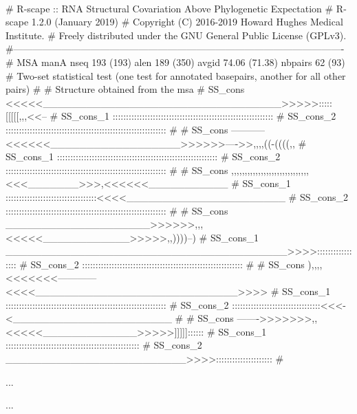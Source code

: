 \\


\begin{sreoutput}
# R-scape :: RNA Structural Covariation Above Phylogenetic Expectation
# R-scape 1.2.0 (January 2019)
# Copyright (C) 2016-2019 Howard Hughes Medical Institute.
# Freely distributed under the GNU General Public License (GPLv3).
#-------------------------------------------------------------------------------------------------------
# MSA manA nseq 193 (193) alen 189 (350) avgid 74.06 (71.38) nbpairs 62 (93)
# Two-set statistical test (one test for annotated basepairs, another for all other pairs)
#
# Structure obtained from the msa
# SS_cons   <<<<<_________________________________>>>>>:::::[[[[[,,,<<--
# SS_cons_1 ::::::::::::::::::::::::::::::::::::::::::::::::::::::::::::
# SS_cons_2 ::::::::::::::::::::::::::::::::::::::::::::::::::::::::::::
#
# SS_cons   -----------<<<<<<__________________>>>>>>---->>,,,,((-((((,,
# SS_cons_1 ::::::::::::::::::::::::::::::::::::::::::::::::::::::::::::
# SS_cons_2 ::::::::::::::::::::::::::::::::::::::::::::::::::::::::::::
#
# SS_cons   ,,,,,,,,,,,,,,,,,,,,,,,,,,,,,<<<_______>>>,<<<<<<___________
# SS_cons_1 ::::::::::::::::::::::::::::::::::<<<<______________________
# SS_cons_2 ::::::::::::::::::::::::::::::::::::::::::::::::::::::::::::
#
# SS_cons   ____________________>>>>>>,,,<<<<<____________>>>>>,,))))--)
# SS_cons_1 _______________________________________>>>>:::::::::::::::::
# SS_cons_2 ::::::::::::::::::::::::::::::::::::::::::::::::::::::::::::
#
# SS_cons   ),,,,<<<<<<<------------<<<<____________________________>>>>
# SS_cons_1 ::::::::::::::::::::::::::::::::::::::::::::::::::::::::::::
# SS_cons_2 :::::::::::::::::::::::::::::::::<<<-<______________________
#
# SS_cons   ------->>>>>>>,,<<<<<_____________>>>>>]]]]]::::::
# SS_cons_1 ::::::::::::::::::::::::::::::::::::::::::::::::::
# SS_cons_2 _________________________>>>>:::::::::::::::::::::
#

  ...

  ...
  

\end{sreoutput}
